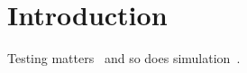 \documentclass{llncs}
\begin{document}
\section{Introduction}
Testing matters~\cite{a2020} and so does simulation~\cite{b2021}.


\end{document}
